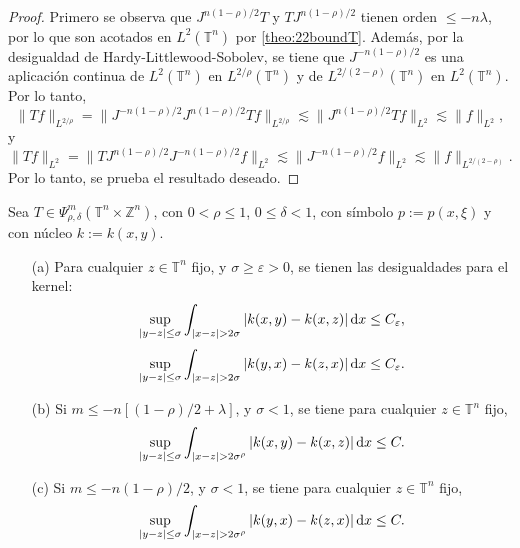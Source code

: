 \begin{proof}
	Primero se observa que $J^{n(1-\rho)/2}T$ y $TJ^{n(1-\rho)/2}$ tienen orden $\leq -n\lambda$, por lo que son acotados en $L^2(\mathbb{T}^n)$ por \cref{theo:22boundT}. Además, por la desigualdad de Hardy-Littlewood-Sobolev, se tiene que $J^{-n(1-\rho)/2}$ es una aplicación continua de $L^2(\mathbb{T}^n)$ en $L^{2/\rho}(\mathbb{T}^n)$ y de $L^{2/(2-\rho)}(\mathbb{T}^n)$ en $L^2(\mathbb{T}^n)$. Por lo tanto, 
	\begin{equation*}
		\| Tf \|_{L^{2/\rho}} = \| J^{-n(1-\rho)/2}J^{n(1-\rho)/2}Tf\|_{L^{2/\rho}} \lesssim \| J^{n(1-\rho)/2}Tf \|_{L^2} \lesssim \| f \|_{L^2},
	\end{equation*}
	y 
	\begin{equation*}
		\| Tf \|_{L^2} = \| TJ^{n(1-\rho)/2}J^{-n(1-\rho)/2}f\|_{L^2} \lesssim \| J^{-n(1-\rho)/2}f \|_{L^2} \lesssim \|f\|_{L^{2/(2-\rho)}}.
	\end{equation*}
	Por lo tanto, se prueba el resultado deseado.
\end{proof}
\begin{theorem}	\label{theo:kernel-estimate-sigma}
	Sea $T \in \Psi^m_{\rho, \delta}(\mathbb{T}^n \times \mathbb{Z}^n) $, con $0 < \rho \leq 1$, $0 \leq \delta < 1$, con símbolo $p:=p(x, \xi)$ y con núcleo $k:=k(x, y)$. 
	\begin{itemize}
		\item[(a)] Para cualquier $z \in \mathbb{T}^n$ fijo, y $\sigma \geq \varepsilon > 0$, se tienen las desigualdades para el kernel:
		\begin{equation}
			\sup_{|y-z| \leq \sigma} \int_{|x-z| > 2\sigma}|k(x, y) - k(x, z)|\mathop{}\!\mathrm{d} x \leq C_\varepsilon,
		\end{equation}
		\begin{equation}
			\sup_{|y-z| \leq \sigma} \int_{|x-z| > 2\sigma}|k(y, x) - k(z, x)|\mathop{}\!\mathrm{d} x \leq C_\varepsilon.
		\end{equation}
		\item[(b)] Si $m \leq -n [(1-\rho)/2 + \lambda] $, y $\sigma < 1$, se tiene para cualquier $z \in \mathbb{T}^n$ fijo, 
		\begin{equation}
			\sup_{|y-z| \leq \sigma} \int_{|x-z| > 2\sigma^\rho}|k(x, y) - k(x, z)|\mathop{}\!\mathrm{d} x \leq C.
		\end{equation}
		\item[(c)] Si $m \leq -n (1 - \rho) / 2$, y $\sigma < 1$, se tiene para cualquier $z \in \mathbb{T}^n$ fijo,
		\begin{equation}
			\sup_{|y-z| \leq \sigma} \int_{|x-z| > 2\sigma^\rho}|k(y, x) - k(z, x)|\mathop{}\!\mathrm{d} x \leq C.
		\end{equation} 
	\end{itemize}
\end{theorem}
